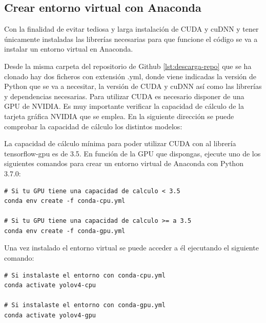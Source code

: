\subsection{Crear entorno virtual con Anaconda}
\label{subsec:creacion-entorno}

Con la finalidad de evitar tediosa y larga instalación de CUDA y cuDNN y tener únicamente instaladas las librerías necesarias para que funcione el código se va a instalar un entorno virtual en Anaconda.

Desde la misma carpeta del repositorio de Github \ref{lst:descarga-repo} que se ha clonado hay dos ficheros con extensión .yml, donde viene indicadas la versión de Python que se va a necesitar, la versión de CUDA y cuDNN así como las librerías y dependencias necesarias. Para utilizar CUDA es necesario disponer de una GPU de NVIDIA. Es muy importante verificar la capacidad de cálculo de la tarjeta gráfica NVIDIA que se emplea. En la siguiente dirección \cite{cuda-gpus} se puede comprobar la capacidad de cálculo los distintos modelos:

La capacidad de cálculo mínima para poder utilizar CUDA con al librería tensorflow-gpu es de 3.5. En función de la GPU que dispongas, ejecute uno de los siguientes comandos para crear un entorno virtual de Anaconda con Python 3.7.0:

\vspace{0.5cm}

\begin{lstlisting}[language=iPython,caption=Creación entorno virtual en Anaconda,captionpos=b,label={lst:crear-env}]
# Si tu GPU tiene una capacidad de calculo < 3.5
conda env create -f conda-cpu.yml

# Si tu GPU tiene una capacidad de calculo >= a 3.5
conda env create -f conda-gpu.yml
\end{lstlisting}

Una vez instalado el entorno virtual se puede acceder a él ejecutando el siguiente comando:

\vspace{0.5cm}

\begin{lstlisting}[language=iPython,caption=Activar entorno virtual de Anaconda,captionpos=b,label={lst:activar-env}]
# Si instalaste el entorno con conda-cpu.yml
conda activate yolov4-cpu

# Si instalaste el entorno con conda-gpu.yml
conda activate yolov4-gpu
\end{lstlisting}

